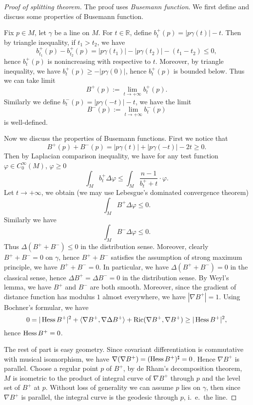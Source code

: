 \begin{proof}[Proof of splitting theorem]
    The proof uses \emph{Busemann function}.
    We first define and discuss some properties of Busemann function.

    Fix $p\in M$, let $\gamma$ be a line on $M$.
    For $t\in\mathbb{R}$, define $b^+_t(p)=|p\gamma(t)|-t$.
    Then by triangle inequality, if $t_1>t_2$, we have
    \[b^+_{t_1}(p)-b^+_{t_2}(p)=|p\gamma(t_1)|-|p\gamma(t_2)|-(t_1-t_2)\leq 0,\]
    hence $b^+_t(p)$ is nonincreasing with respective to $t$.
    Moreover, by triangle inequality, we have $b^+_t(p)\geq-|p\gamma(0)|$, hence $b^+_t(p)$ is bounded below.
    Thus we can take limit
    \[B^+(p):=\lim_{t\to+\infty}b^+_t(p).\]
    Similarly we define $b^-_t(p)=|p\gamma(-t)|-t$, we have the limit
    \[B^-(p):=\lim_{t\to+\infty}b^-_t(p)\]
    is well-defined.

    Now we discuss the properties of Busemann functions.
    First we notice that
    \[B^+(p)+B^-(p)=|p\gamma(t)|+|p\gamma(-t)|-2t\geq 0.\]
    Then by Laplacian comparison inequality, we have for any test function $\varphi\in C^\infty_0(M)$, $\varphi\geq 0$
    \[\int_{M}b^+_t\Delta\varphi\leq\int_M\frac{n-1}{b^+_t+t}\cdot\varphi.\]
    Let $t\to+\infty$, we obtain (we may use Lebesgue's dominated convergence theorem)
    \[\int_MB^+\Delta\varphi\leq 0.\]
    Similarly we have
    \[\int_MB^-\Delta\varphi\leq 0.\]
    Thus $\Delta(B^++B^-)\leq 0$ in the distribution sense.
    Moreover, clearly $B^++B^-=0$ on $\gamma$, hence $B^++B^-$ satisfies the assumption of strong maximum principle, we have $B^++B^-=0$.
    In particular, we have $\Delta(B^++B^-)=0$ in the classical sense, hence $\Delta B^+=\Delta B^-=0$ in the distribution sense.
    By Weyl's lemma, we have $B^+$ and $B^-$ are both smooth.
    Moreover, since the gradient of distance function has modulus $1$ almost everywhere, we have $|\nabla B^+|=1$.
    Using Bochner's formular, we have
    \[0=|\operatorname{Hess}{B^+}|^2+\langle\nabla B^+,\nabla\Delta B^+\rangle+\operatorname{Ric}(\nabla B^+,\nabla B^+)\geq|\operatorname{Hess}{B^+}|^2,\]
    hence $\operatorname{Hess}{B^+}=0$.

    The rest of part is easy geometry.
    Since covariant differentiation is commutative with musical isomorphism, we have $\nabla(\nabla B^+)=(\operatorname{Hess}{B^+})^\sharp=0$.
    Hence $\nabla B^+$ is parallel.
    Choose a regular point $p$ of $B^+$, by de Rham's decomposition theorem, $M$ is isometric to the product of integral curve of $\nabla B^+$ through $p$ and the level set of $B^+$ at $p$.
    Without loss of generality we can assume $p$ lies on $\gamma$, then since $\nabla B^+$ is parallel, the integral curve is the geodesic through $p$, i.\ e.\ the line.
\end{proof}